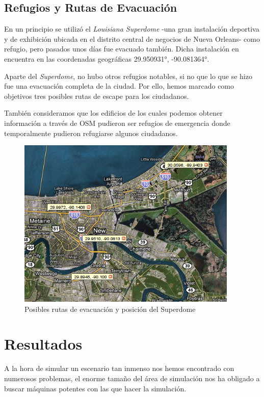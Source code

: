 \subsection{Refugios y Rutas de Evacuación}

En un principio se utilizó el {\em Louisiana Superdome} -una gran instalación
deportiva y de exhibición ubicada en el distrito central de negocios de Nueva
Orleans- como refugio, pero pasados unos días fue evacuado también. Dicha
instalación en encuentra en las coordenadas geográficas 29.950931°, -90.081364°.

Aparte del {\em Superdome}, no hubo otros refugios notables, si no que lo que se
hizo fue una evacuación completa de la ciudad. Por ello, hemos marcado como
objetivos tres posibles rutas de escape para los ciudadanos.

También consideramos que los edificios de los cuales podemos obtener
información a través de OSM pudieron ser refugios de emergencia donde
temporalmente pudieron refugiarse algunos ciudadanos. %

\begin{figure}[H]
 \centering
 \includegraphics[width=105mm]{figuras/cap6/evacuation.png}
 \caption{Posibles rutas de evacuación y posición del Superdome}
\end{figure}

\section{Resultados}

A la hora de simular un escenario tan inmenso nos hemos encontrado con
numerosos problemas, el enorme tamaño del área de simulación nos ha obligado a
buscar máquinas potentes con las que hacer la simulación.

